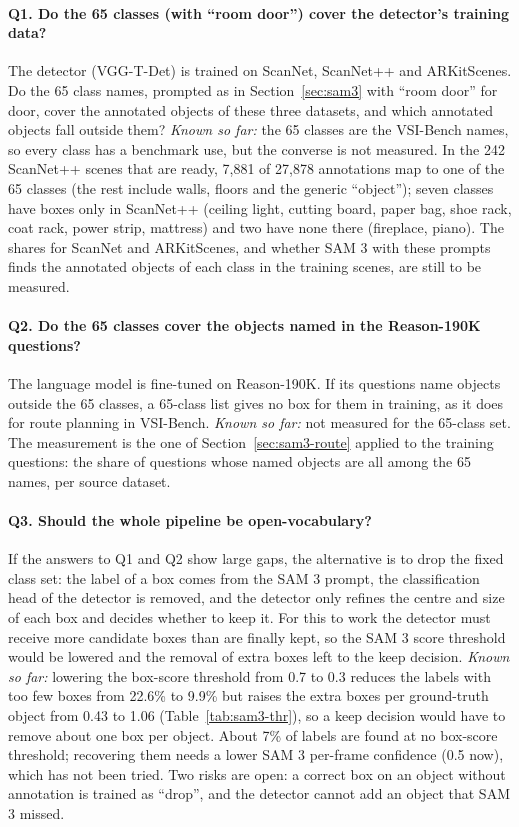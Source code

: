 \paragraph{Q1. Do the 65 classes (with ``room door'') cover the detector's training data?}
The detector (VGG-T-Det) is trained on ScanNet, ScanNet++ and ARKitScenes. Do the 65 class names, prompted as
in Section~\ref{sec:sam3} with ``room door'' for door, cover the annotated objects of these three datasets, and
which annotated objects fall outside them?
\emph{Known so far:} the 65 classes are the VSI-Bench names, so every class has a benchmark use, but the
converse is not measured. In the 242 ScanNet++ scenes that are ready, 7,881 of 27,878 annotations map to one of
the 65 classes (the rest include walls, floors and the generic ``object''); seven classes have boxes only in
ScanNet++ (ceiling light, cutting board, paper bag, shoe rack, coat rack, power strip, mattress) and two have
none there (fireplace, piano). The shares for ScanNet and ARKitScenes, and whether SAM 3 with these prompts
finds the annotated objects of each class in the training scenes, are still to be measured.

\paragraph{Q2. Do the 65 classes cover the objects named in the Reason-190K questions?}
The language model is fine-tuned on Reason-190K. If its questions name objects outside the 65 classes, a
65-class list gives no box for them in training, as it does for route planning in VSI-Bench.
\emph{Known so far:} not measured for the 65-class set. The measurement is the one of
Section~\ref{sec:sam3-route} applied to the training questions: the share of questions whose named objects are
all among the 65 names, per source dataset.

\paragraph{Q3. Should the whole pipeline be open-vocabulary?}
If the answers to Q1 and Q2 show large gaps, the alternative is to drop the fixed class set: the label of a box
comes from the SAM 3 prompt, the classification head of the detector is removed, and the detector only refines
the centre and size of each box and decides whether to keep it. For this to work the detector must receive
more candidate boxes than are finally kept, so the SAM 3 score threshold would be lowered and the removal of
extra boxes left to the keep decision.
\emph{Known so far:} lowering the box-score threshold from 0.7 to 0.3 reduces the labels with too few boxes
from 22.6\% to 9.9\% but raises the extra boxes per ground-truth object from 0.43 to 1.06
(Table~\ref{tab:sam3-thr}), so a keep decision would have to remove about one box per object. About 7\% of
labels are found at no box-score threshold; recovering them needs a lower SAM 3 per-frame confidence (0.5 now),
which has not been tried. Two risks are open: a correct box on an object without annotation is trained as
``drop'', and the detector cannot add an object that SAM 3 missed.

